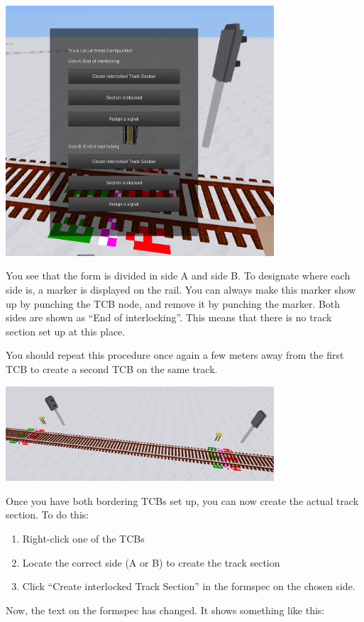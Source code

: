 \documentclass[english]{paper}
\begin{document}
\includegraphics[width=10cm]{1_home_moritz_Home_Projekte_Minetest_minetest_m____lyx_img_Bildschirmfoto_2018-08-30_14-26-35.png}

You see that the form is divided in side A and side B. To designate
where each side is, a marker is displayed on the rail. You can always
make this marker show up by punching the TCB node, and remove it by
punching the marker. Both sides are shown as ``End of interlocking''.
This means that there is no track section set up at this place.

You should repeat this procedure once again a few meters away from
the first TCB to create a second TCB on the same track.

\includegraphics[width=10cm]{2_home_moritz_Home_Projekte_Minetest_minetest_m____lyx_img_Bildschirmfoto_2018-08-30_14-32-48.png}

Once you have both bordering TCBs set up, you can now create the actual
track section. To do this:
\begin{enumerate}
\item Right-click one of the TCBs
\item Locate the correct side (A or B) to create the track section
\item Click ``Create interlocked Track Section'' in the formspec on the
chosen side.
\end{enumerate}
Now, the text on the formspec has changed. It shows something like
this:
\end{document}
